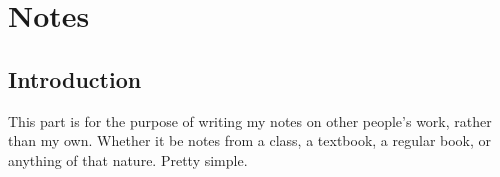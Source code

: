 \part{Notes}
\chapter{Introduction}
This part is for the purpose of writing my notes on other people's work, rather than my own. Whether it be notes from a class, a textbook, a regular book, or anything of that nature. Pretty simple.
